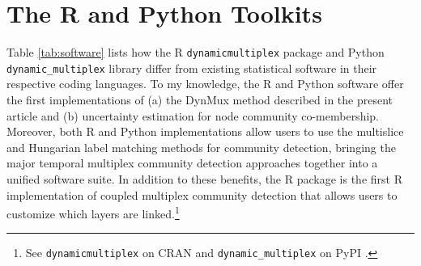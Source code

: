 \documentclass[11pt, letterpaper]{article}
\begin{document}
\section{The R and Python Toolkits}
Table \ref{tab:software} lists how the R \texttt{dynamicmultiplex} package and Python \texttt{dynamic\_multiplex} library differ from existing statistical software in their respective coding languages. To my knowledge, the R and Python software offer the first implementations of (a) the DynMux method described in the present article and (b) uncertainty estimation for node community co-membership. Moreover, both R and Python implementations allow users to use the multislice and Hungarian label matching methods for community detection, bringing the major temporal multiplex community detection approaches together into a unified software suite. In addition to these benefits, the R package is the first R implementation of coupled multiplex community detection that allows users to customize which layers are linked.\footnote{See \texttt{dynamicmultiplex} on CRAN \citep{dynamicmultiplexR} and \texttt{dynamic\_multiplex} on PyPI \citep{dynamicmultiplexPy}.}
\end{document}
